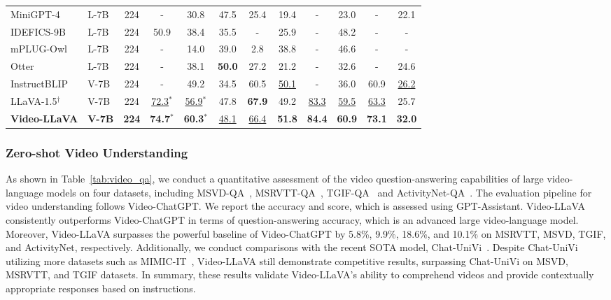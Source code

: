 \begin{table*}[t]
\begin{tabular}{llc|ccccc|cccc}
    MiniGPT-4 & L-7B & 224 & - & 30.8 & 47.5 & 25.4 & 19.4 & - & 23.0 & - & 22.1 \\
    IDEFICS-9B & L-7B & 224 & {50.9} & 38.4 & 35.5 & - & 25.9 & - & {48.2} & - & - \\
    mPLUG-Owl & L-7B & 224 & - & 14.0 & 39.0 & 2.8 & 38.8 & - & 46.6 & - & - \\
    Otter & L-7B & 224 & - & 38.1 & \textbf{50.0} & 27.2 & 21.2 & - & 32.6 & - & 24.6 \\
    InstructBLIP & V-7B & 224 & - & {49.2} & 34.5 & {60.5} & \underline{50.1} & - & 36.0 & {60.9} & \underline{26.2} \\
    LLaVA-1.5$^{\dag}$ & V-7B & 224 & \underline{72.3}$^*$ & \underline{56.9}$^*$ & 47.8 & \textbf{67.9} & 49.2 & \underline{83.3} & \underline{59.5} & \underline{63.3} & 25.7 \\
    \rowcolor{blue} \textbf{Video-LLaVA} & \textbf{V-7B} & \textbf{224} & \textbf{74.7}$^*$ & \textbf{60.3}$^*$ & \underline{48.1} & \underline{66.4} & \textbf{51.8} & \textbf{84.4} & \textbf{60.9} & \textbf{73.1} & \textbf{32.0} \\
    \bottomrule
  \end{tabular}
\end{table*}

\subsubsection{Zero-shot Video Understanding}
As shown in Table~\ref{tab:video_qa}, we conduct a quantitative assessment of the video question-answering capabilities of large video-language models on four datasets, including MSVD-QA~\cite{chen2011collecting}, MSRVTT-QA~\cite{xu2016msr}, TGIF-QA~\cite{jang2017tgif} and ActivityNet-QA~\cite{yu2019activitynet}. The evaluation pipeline for video understanding follows Video-ChatGPT. We report the accuracy and score, which is assessed using GPT-Assistant. Video-LLaVA consistently outperforms Video-ChatGPT in terms of question-answering accuracy, which is an advanced large video-language model. Moreover, Video-LLaVA surpasses the powerful baseline of Video-ChatGPT by 5.8\%, 9.9\%, 18.6\%, and 10.1\% on MSRVTT, MSVD, TGIF, and ActivityNet, respectively. Additionally, we conduct comparisons with the recent SOTA model, Chat-UniVi~\cite{Chat-UniVi}. Despite Chat-UniVi utilizing more datasets such as MIMIC-IT~\cite{li2023otter}, Video-LLaVA still demonstrate competitive results, surpassing Chat-UniVi on MSVD, MSRVTT, and TGIF datasets. In summary, these results validate Video-LLaVA's ability to comprehend videos and provide contextually appropriate responses based on instructions.
 

